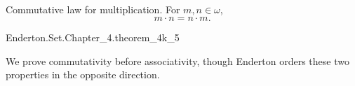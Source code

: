 \documentclass{report}
\begin{document}
\subsection{}

  \begin{theorem}[4K-5]
    Commutative law for multiplication.
    For $m, n \in \omega$, $$m \cdot n = n \cdot m.$$
  \end{theorem}

    {Enderton.Set.Chapter\_4.theorem\_4k\_5}


  \begin{note}
    We prove commutativity before associativity, though Enderton orders these
    two properties in the opposite direction.
  \end{note}
\end{document}
